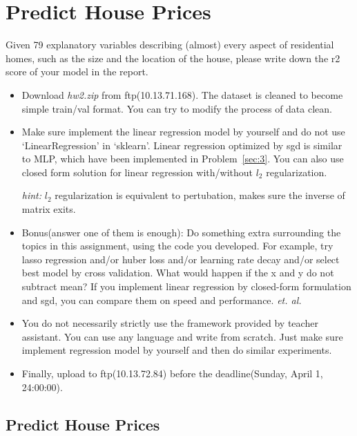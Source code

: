 \documentclass[12pt]{article}
\begin{document}

\section{Predict House Prices} \label{sec:4}
Given 79 explanatory variables describing (almost) every aspect of residential homes, such as the size  and the location of the house, please write down the r2 score of your model in the report.

\begin{itemize}
	\item  Download \textit{hw2.zip} from ftp(10.13.71.168). The dataset is cleaned to become simple train/val format. You can try to modify the process of data clean.
	\item Make sure implement the {linear} regression model by yourself and do not use {{`LinearRegression' in `sklearn'}}.  Linear regression optimized by sgd is similar to MLP, which have been implemented in {Problem~\ref{sec:3}}. You can also use closed form solution for linear regression with/without $l_2$ regularization.

	      \textit{hint:} $l_2$ regularization is equivalent to pertubation, makes sure the inverse of matrix exits.

	\item {{Bonus(answer one of them is enough)}}: Do something extra surrounding the topics in this assignment, using the code you developed. For example, try lasso regression and/or huber loss and/or learning rate decay and/or select best model by cross validation. What would happen if the x and y do not subtract mean? If you implement linear  regression by  closed-form formulation and sgd, you can compare them on speed and performance. \textit{et. al.}

	\item You do not necessarily strictly use the framework provided by teacher assistant. You can use any language and write from scratch. Just make sure implement regression model by yourself and then do similar experiments.
	\item Finally, upload to ftp(10.13.72.84) before the deadline(Sunday, April 1, 24:00:00).
\end{itemize}

\subsection{Predict House Prices}
\end{document}
